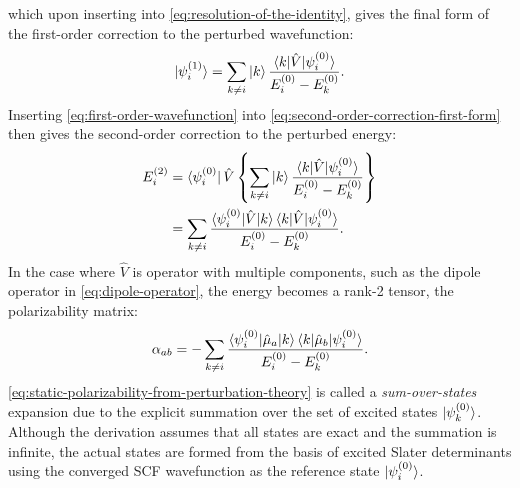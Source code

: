 \documentclass[%
class = book,%
crop = false,%
float = true,%
multi = true,%
preview = false,%
]{standalone}
\begin{document}
which upon inserting into \eqref{eq:resolution-of-the-identity}, gives the final form of the first-order correction to the perturbed wavefunction:
\begin{equation}
  \label{eq:first-order-wavefunction}
  \ket{\psi_{i}^{(1)}} = \sum_{k\neq i} \ket{k} \frac{\braket{k|\hat{V}|\psi_{i}^{(0)}}}{E_{i}^{(0)} - E_{k}^{(0)}}.
\end{equation}
Inserting \eqref{eq:first-order-wavefunction} into \eqref{eq:second-order-correction-first-form} then gives the second-order correction to the perturbed energy:
\begin{equation}
  \label{eq:second-order-energy}
  \begin{aligned}
    E_{i}^{(2)} &= \bra{\psi_{i}^{(0)}} \hat{V} \left\{ \sum_{k\neq i} \ket{k} \frac{\braket{k|\hat{V}|\psi_{i}^{(0)}}}{E_{i}^{(0)} - E_{k}^{(0)}} \right\} \\
    &= \sum_{k \neq i} \frac{\braket{\psi_{i}^{(0)}|\hat{V}|k}\braket{k|\hat{V}|\psi_{i}^{(0)}}}{E_{i}^{(0)} - E_{k}^{(0)}}.
  \end{aligned}
\end{equation}
In the case where \(\hat{V}\) is operator with multiple components, such as the dipole operator in \eqref{eq:dipole-operator}, the energy becomes a rank-2 tensor, the polarizability matrix:
\begin{equation}
  \label{eq:static-polarizability-from-perturbation-theory}
  \alpha_{ab}= - \sum_{k \neq i} \frac{\braket{\psi_{i}^{(0)}|\hat{\mu}_{a}|k}\braket{k|\hat{\mu}_{b}|\psi_{i}^{(0)}}}{E_{i}^{(0)} - E_{k}^{(0)}}.
\end{equation} %
\eqref{eq:static-polarizability-from-perturbation-theory} is called a \emph{sum-over-states} expansion due to the explicit summation over the set of excited states \(\ket{\psi_{k}^{(0)}}\). Although the derivation assumes that all states are exact and the summation is infinite, the actual states are formed from the basis of excited Slater determinants using the converged SCF wavefunction as the reference state \(\ket{\psi_{i}^{(0)}}\).

\section{\texorpdfstring{}{Static (time-independent) response properties}}
\label{sec:dynamic-properties}
\end{document}
